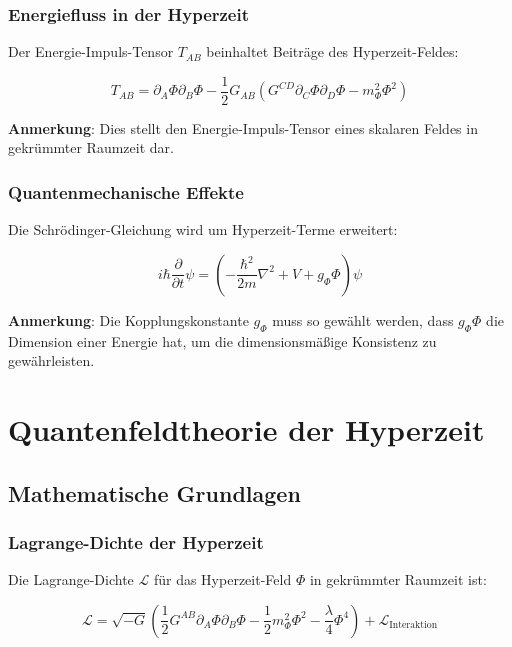 \documentclass[11pt,a4paper]{article}
\begin{document}
\subsubsection{Energiefluss in der Hyperzeit}

Der Energie-Impuls-Tensor $T_{AB}$ beinhaltet Beiträge des Hyperzeit-Feldes:

\begin{equation}
T_{AB} = \partial_A \Phi \partial_B \Phi - \frac{1}{2} G_{AB} \left( G^{CD} \partial_C \Phi \partial_D \Phi - m_\Phi^2 \Phi^2 \right)
\end{equation}

\textbf{Anmerkung}: Dies stellt den Energie-Impuls-Tensor eines skalaren Feldes in gekrümmter Raumzeit dar.

\subsubsection{Quantenmechanische Effekte}

Die Schrödinger-Gleichung wird um Hyperzeit-Terme erweitert:

\begin{equation}
i\hbar \frac{\partial}{\partial t} \psi = \left( -\frac{\hbar^2}{2m} \nabla^2 + V + g_\Phi \Phi \right) \psi
\end{equation}

\textbf{Anmerkung}: Die Kopplungskonstante $g_\Phi$ muss so gewählt werden, dass $g_\Phi \Phi$ die Dimension einer Energie hat, um die dimensionsmäßige Konsistenz zu gewährleisten.

\section{Quantenfeldtheorie der Hyperzeit}

\subsection{Mathematische Grundlagen}

\subsubsection{Lagrange-Dichte der Hyperzeit}

Die Lagrange-Dichte $\mathcal{L}$ für das Hyperzeit-Feld $\Phi$ in gekrümmter Raumzeit ist:

\begin{equation}
\mathcal{L} = \sqrt{-G} \left( \frac{1}{2} G^{AB} \partial_A \Phi \partial_B \Phi - \frac{1}{2} m_\Phi^2 \Phi^2 - \frac{\lambda}{4} \Phi^4 \right) + \mathcal{L}_{\text{Interaktion}}
\end{equation}
\end{document}
